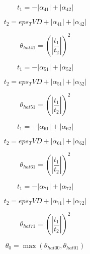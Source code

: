 \documentclass{article}
\begin{document}
\begin{dmath}t_{1} = - \left|{\alpha_{41}}\right| + \left|{\alpha_{42}}\right|\end{dmath}

\begin{dmath}t_{2} = eps_TVD + \left|{\alpha_{41}}\right| + \left|{\alpha_{42}}\right|\end{dmath}

\begin{dmath}\theta_{hat 41} = \left(\left|{\frac{t_{1}}{t_{2}}}\right| \right)^{2}\end{dmath}

\begin{dmath}t_{1} = - \left|{\alpha_{51}}\right| + \left|{\alpha_{52}}\right|\end{dmath}

\begin{dmath}t_{2} = eps_TVD + \left|{\alpha_{51}}\right| + \left|{\alpha_{52}}\right|\end{dmath}

\begin{dmath}\theta_{hat 51} = \left(\left|{\frac{t_{1}}{t_{2}}}\right| \right)^{2}\end{dmath}

\begin{dmath}t_{1} = - \left|{\alpha_{61}}\right| + \left|{\alpha_{62}}\right|\end{dmath}

\begin{dmath}t_{2} = eps_TVD + \left|{\alpha_{61}}\right| + \left|{\alpha_{62}}\right|\end{dmath}

\begin{dmath}\theta_{hat 61} = \left(\left|{\frac{t_{1}}{t_{2}}}\right| \right)^{2}\end{dmath}

\begin{dmath}t_{1} = - \left|{\alpha_{71}}\right| + \left|{\alpha_{72}}\right|\end{dmath}

\begin{dmath}t_{2} = eps_TVD + \left|{\alpha_{71}}\right| + \left|{\alpha_{72}}\right|\end{dmath}

\begin{dmath}\theta_{hat 71} = \left(\left|{\frac{t_{1}}{t_{2}}}\right| \right)^{2}\end{dmath}

\begin{dmath}\theta_{0} = \max\left(\theta_{hat 00}, \theta_{hat 01}\right)\end{dmath}
\end{document}
